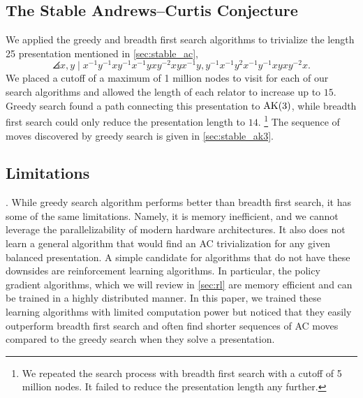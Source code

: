 \subsection{The Stable Andrews--Curtis Conjecture}

We applied the greedy and breadth first search algorithms to trivialize the length 25 presentation mentioned in \autoref{sec:stable_ac},
\[
\angles{ x, y \mid
x^{-1}y^{-1}xy^{-1}x^{-1}yxy^{-2}xyx^{-1}y,
y^{-1}x^{-1}y^2x^{-1}y^{-1}xyxy^{-2}x }.
\]
We placed a cutoff of a maximum of 1 million nodes to visit for each of our search algorithms and allowed the length of each relator to increase up to $15$. Greedy search found a path connecting this presentation to $\text{AK}(3)$, while breadth first search could only reduce the presentation length to $14$.
\footnote{We repeated the search process with breadth first search with a cutoff of 5 million nodes. It failed to reduce the presentation length any further.}
The sequence of moves discovered by greedy search is given in \autoref{sec:stable_ak3}.

\subsection{Limitations}. While greedy search algorithm performs better than breadth first search, it has some of the same limitations. Namely, it is memory inefficient, and we cannot leverage the parallelizability of modern hardware architectures. It also does not learn a general algorithm that would find an AC trivialization for any given balanced presentation. A simple candidate for algorithms that do not have these downsides are reinforcement learning algorithms. In particular, the policy gradient algorithms, which we will review in \autoref{sec:rl} are memory efficient and can be trained in a highly distributed manner. In this paper, we trained these learning algorithms with limited computation power but noticed that they easily outperform breadth first search and often find shorter sequences of AC moves compared to the greedy search when they solve a presentation.
